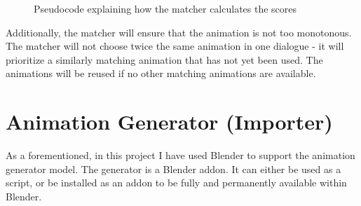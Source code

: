 \begin{figure}[H]
\centerline{}
\caption{Pseudocode explaining how the matcher calculates the scores}\label{fig:matcher}
\end{figure}

Additionally, the matcher will ensure that the animation is not too monotonous. The matcher will not choose twice the same animation in one dialogue - it  will prioritize a similarly matching animation that has not yet been used. The animations will be reused if no other matching animations are available.


\section{Animation Generator (Importer)}
\label{sec:generatordesign}

As a forementioned, in this project I have used Blender to support the animation generator model. The generator is a Blender addon.  It can either be used as a script, or be installed as an addon to be fully and permanently available within Blender.

